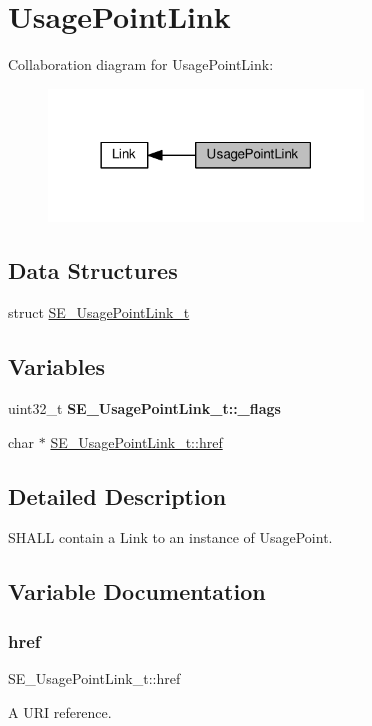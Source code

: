 \hypertarget{group__UsagePointLink}{}\section{Usage\+Point\+Link}
\label{group__UsagePointLink}
Collaboration diagram for Usage\+Point\+Link\+:\nopagebreak
\begin{figure}[H]
\begin{center}
\leavevmode
\includegraphics[width=237pt]{group__UsagePointLink}
\end{center}
\end{figure}
\subsection*{Data Structures}
\begin{DoxyCompactItemize}
\item 
struct \hyperlink{structSE__UsagePointLink__t}{S\+E\+\_\+\+Usage\+Point\+Link\+\_\+t}
\end{DoxyCompactItemize}
\subsection*{Variables}
\begin{DoxyCompactItemize}
\item 
\mbox{\label{group__UsagePointLink_ga13203379efbca9ae049548fb4c369d4a}} 
uint32\+\_\+t {\bfseries S\+E\+\_\+\+Usage\+Point\+Link\+\_\+t\+::\+\_\+flags}
\item 
char $\ast$ \hyperlink{group__UsagePointLink_ga3ab372c61d11d3ad50c2e301074a7644}{S\+E\+\_\+\+Usage\+Point\+Link\+\_\+t\+::href}
\end{DoxyCompactItemize}


\subsection{Detailed Description}
S\+H\+A\+LL contain a Link to an instance of Usage\+Point. 

\subsection{Variable Documentation}
\mbox{\label{group__UsagePointLink_ga3ab372c61d11d3ad50c2e301074a7644}} 
\subsubsection{\texorpdfstring{href}{href}}
{\footnotesize\ttfamily S\+E\+\_\+\+Usage\+Point\+Link\+\_\+t\+::href}

A U\+RI reference. 